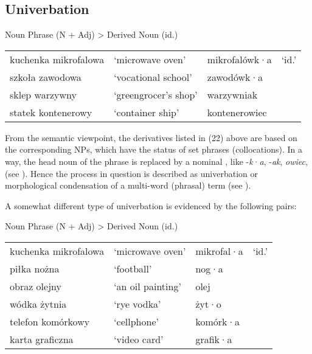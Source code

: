 \documentclass[output=paper]{LSP/langsci}
\begin{document}
\subsection*{Univerbation}

\ea\label{ex:szymanek:21}
{{Noun Phrase (N + Adj)}} > {{Derived Noun}} {(id.)}

\begin{tabular}{llll}
 kuchenka mikrofalowa & ‘microwave oven’ & mikrofalówk·a &‘id.’\\
 szkoła zawodowa& ‘vocational school’  &  zawodówk·a&\\
 sklep warzywny &‘greengrocer’s shop’ &   warzywniak&\\
  statek kontenerowy &‘container ship’  &  kontenerowiec&\\
  \end{tabular}
\z

{From the semantic viewpoint, the derivatives listed in (22) above are based on the corresponding NPs, which have the status of set phrases (collocations). In a way, the head noun of the phrase is replaced by a nominal , like -}{\textit{k}}·{\textit{a}}{, -}{\textit{ak}}, {\textit{owiec}}{, (see \citealt[419]{GrzegorczykowaPuzynina1999}). Hence the process in question is described as univerbation or morphological condensation of a multi-word (phrasal) term (see \citealt[113ff]{Laskowski1981}).}

A somewhat different type of univerbation is evidenced by the following pairs:

\ea\label{ex:szymanek:22}
Noun Phrase (N + Adj) > Derived Noun (id.)\\

\begin{tabular}{llll}
 kuchenka mikrofalowa  & ‘microwave oven’  & mikrofal·a & ‘id.’\\
 piłka nożna & ‘football’      &   nog·a\\
 obraz olejny&  ‘an oil painting’  &     olej\\
 wódka żytnia & ‘rye vodka’   &    żyt·o\\
 telefon komórkowy & ‘cellphone’   &    komórk·a\\
 karta graficzna&  ‘video card’  &     grafik·a\\
 \end{tabular}
\z
\end{document}
